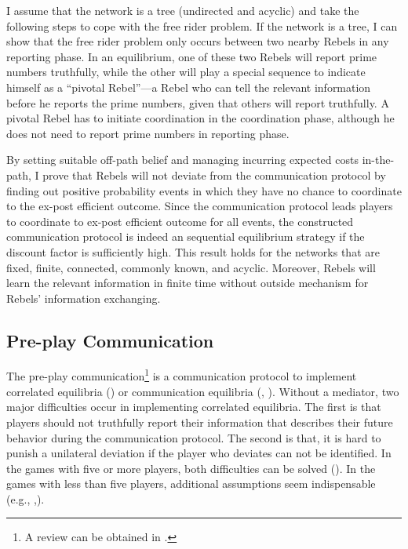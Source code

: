 \documentclass[12pt]{article}
\theoremstyle{definition}
\theoremstyle{remark}
\theoremstyle{claim}
\begin{document}
I assume that the network is a tree (undirected and acyclic) and take the following steps to cope with the free rider problem. If the network is a tree, I can show that the free rider problem only occurs between two nearby Rebels in any reporting phase. In an equilibrium, one of these two Rebels will report prime numbers truthfully, while the other will play a special sequence to indicate himself as a ``pivotal Rebel''---a Rebel who can tell the relevant information before he reports the prime numbers, given that others will report truthfully. A pivotal Rebel has to initiate coordination in the coordination phase, although he does not need to report prime numbers in reporting phase. 

By setting suitable off-path belief and managing incurring expected costs in-the-path, I prove that Rebels will not deviate from the communication protocol by finding out positive probability events in which they have no chance to coordinate to the ex-post efficient outcome. Since the communication protocol leads players to coordinate to ex-post efficient outcome for all events, the constructed communication protocol is indeed an sequential equilibrium strategy if the discount factor is sufficiently high. This result holds for the networks that are fixed, finite, connected, commonly known, and acyclic. Moreover, Rebels will learn the relevant information in finite time without outside mechanism for Rebels' information exchanging.










\subsection*{Pre-play Communication}



The pre-play communication\footnote{A review can be obtained in \citep{Forges2009}.} is a communication protocol to implement correlated equilibria (\citep{Aumann1974}) or communication equilibria (\citep{Forges1986}, \citep{Myerson2004} ). Without a mediator, two major difficulties occur in implementing correlated equilibria. The first is that players should not truthfully report their information that describes their future behavior during the communication protocol.  The second is that, it is hard to punish a unilateral deviation if the player who deviates can not be identified. In the games with five or more players, both difficulties can be solved (\citep{Gerardi2004}). In the games with less than five players,  additional assumptions seem indispensable (e.g., \citep{Barany1987},\citep{Ben-Porath1996}).
\end{document}
